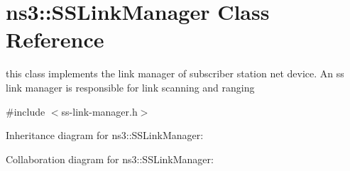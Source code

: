 \hypertarget{classns3_1_1SSLinkManager}{}\section{ns3\+:\+:S\+S\+Link\+Manager Class Reference}
\label{classns3_1_1SSLinkManager}


this class implements the link manager of subscriber station net device. An ss link manager is responsible for link scanning and ranging  




{\ttfamily \#include $<$ss-\/link-\/manager.\+h$>$}



Inheritance diagram for ns3\+:\+:S\+S\+Link\+Manager\+:


Collaboration diagram for ns3\+:\+:S\+S\+Link\+Manager\+:
